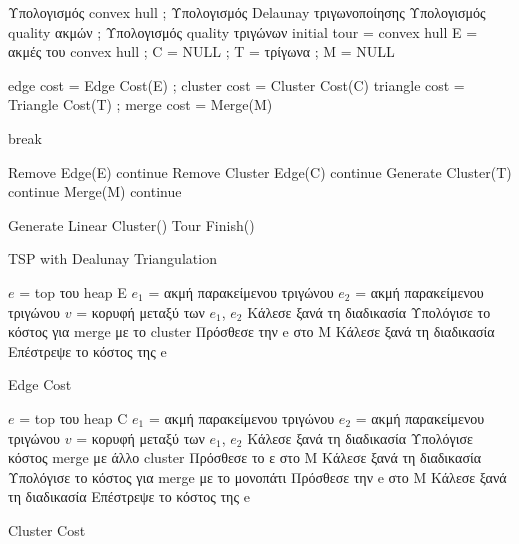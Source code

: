 \documentclass[oneside,12pt]{book}
\theoremstyle{definition}
\begin{document}
\begin{algorithm}[H]
	\SetAlgoLined

	Υπολογισμός convex hull ;
	Υπολογισμός Delaunay τριγωνοποίησης \;
	Υπολογισμός quality ακμών ;
	Υπολογισμός quality τριγώνων \;
	initial tour = convex hull \;
	Ε = ακμές του convex hull ;
	C = NULL ;
	T = τρίγωνα ;
	M = NULL \;
	{edge cost = Edge Cost(E) ;
	cluster cost = Cluster Cost(C) \;
	triangle cost = Triangle Cost(T) ;
	merge cost = Merge(M) \;

	{break \;}

	{Remove Edge(E) \;
	continue \;}
	{Remove Cluster Edge(C) \;
	continue \;}
	{Generate Cluster(T) \;
	continue \;}
	{Merge(M) \;
	continue \;}}

	Generate Linear Cluster() \;
	Tour Finish() \;

	\caption{TSP with Dealunay Triangulation}
\end{algorithm}

\newpage

\begin{algorithm}[H]
	\SetAlgoLined

	\(e\) = top του heap Ε \;
	\(e_1\) = ακμή παρακείμενου τριγώνου \;
	\(e_2\) = ακμή παρακείμενου τριγώνου \;
	\(v\) = κορυφή μεταξύ των \(e_1\), \(e_2\) \;
	{Κάλεσε ξανά τη διαδικασία \;}
	{Υπολόγισε το κόστος για merge με το cluster \;
	Πρόσθεσε την e στο Μ \;
	Κάλεσε ξανά τη διαδικασία \;}
	Επέστρεψε το κόστος της e \;

	\caption{Edge Cost}
\end{algorithm}

\newpage

\begin{algorithm}[H]
	\SetAlgoLined

	\(e\) = top του heap C \;
	\(e_1\) = ακμή παρακείμενου τριγώνου \;
	\(e_2\) = ακμή παρακείμενου τριγώνου \;
	\(v\) = κορυφή μεταξύ των \(e_1\), \(e_2\) \;
	{
		{Κάλεσε ξανά τη διαδικασία \;}}
	Υπολόγισε κόστος merge με άλλο cluster \;
	Πρόσθεσε το ε στο Μ \;
	Κάλεσε ξανά τη διαδικασία \;
	{Υπολόγισε το κόστος για merge με το μονοπάτι \;
		Πρόσθεσε την e στο Μ \;
		Κάλεσε ξανά τη διαδικασία \;}
	Επέστρεψε το κόστος της e \;

	\caption{Cluster Cost}
\end{algorithm}
\end{document}
